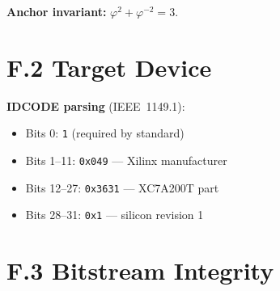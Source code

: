 \textbf{Anchor invariant:} \(\varphi^2 + \varphi^{-2} = 3\).

\section*{F.2 Target Device}

\begin{table}[h]
\centering
{}
\caption{FPGA device identification. Board is marked XC7A100T but JTAG IDCODE
corresponds to XC7A200T v1. The design (83~LUT, 27~FF) fits either device;\, no
resynthesis required.}
\end{table}

\textbf{IDCODE parsing} (IEEE~1149.1):
\begin{itemize}
  \item Bits 0: \texttt{1} (required by standard)
  \item Bits 1--11: \texttt{0x049} — Xilinx manufacturer
  \item Bits 12--27: \texttt{0x3631} — XC7A200T part
  \item Bits 28--31: \texttt{0x1} — silicon revision 1
\end{itemize}

\section*{F.3 Bitstream Integrity}

\begin{table}[h]
\centering
{}
\caption{Bitstream file metadata. Full SHA-256 stored in
.}
\end{table}

